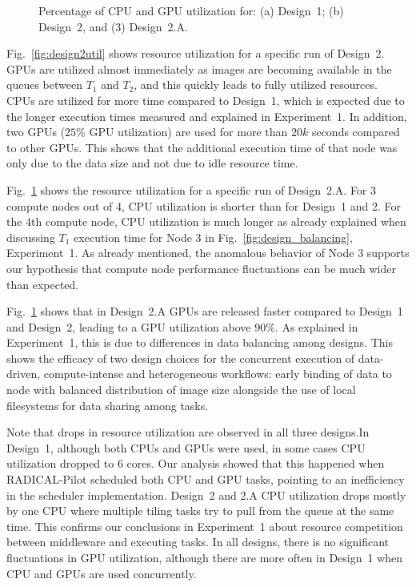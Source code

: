 \begin{figure}[H]
\begin{subfigure}[b]{0.65\textwidth}
        \caption{}
        \label{fig:design2autil}
    \end{subfigure}
    \caption{Percentage of CPU and GPU utilization for: (a) Design~1; (b)
    Design~2, and (3) Design~2.A.}
    \label{fig:Utilization}
\end{figure}

Fig.~\ref{fig:design2util} shows resource utilization for a specific run of
Design~2. GPUs are utilized almost immediately as images are becoming
available in the queues between $T_{1}$ and $T_{2}$, and this quickly leads to
fully utilized resources. CPUs are utilized for more time compared to
Design~1, which is expected due to the longer execution times measured and
explained in Experiment~1. In addition, two GPUs ($25\%$ GPU utilization) are
used for more than $20k$ seconds compared to other GPUs. This shows that the
additional execution time of that node was only due to the data size and not
due to idle resource time.

Fig.~\ref{fig:design2autil} shows the resource utilization for a specific run
of Design~2.A. For 3 compute nodes out of 4, CPU utilization is shorter than
for Design~1 and 2. For the 4th compute node, CPU utilization is much longer
as already explained when discussing $T_{1}$ execution time for Node 3 in
Fig.~\ref{fig:design_balancing}, Experiment~1. As already mentioned, the
anomalous behavior of Node 3 supports our hypothesis that compute node
performance fluctuations can be much wider than expected.

Fig.~\ref{fig:design2autil} shows that in Design~2.A GPUs are released faster
compared to Design~1 and Design~2, leading to a GPU utilization above $90\%$.
As explained in Experiment~1, this is due to differences in data balancing
among designs. This shows the efficacy of two design choices for the
concurrent execution of data-driven, compute-intense and heterogeneous
workflows: early binding of data to node with balanced distribution of image
size alongside the use of local filesystems for data sharing among tasks.

Note that drops in resource utilization are observed in all three designs.In
Design~1, although both CPUs and GPUs were used, in some cases CPU utilization
dropped to 6 cores. Our analysis showed that this happened when RADICAL-Pilot
scheduled both CPU and GPU tasks, pointing to an inefficiency in the scheduler
implementation. Design~2 and 2.A CPU utilization drops mostly by one CPU where
multiple tiling tasks try to pull from the queue at the same time. This
confirms our conclusions in Experiment~1 about resource competition between
middleware and executing tasks. In all designs, there is no significant
fluctuations in GPU utilization, although there are more often in Design~1
when CPU and GPUs are used concurrently.

